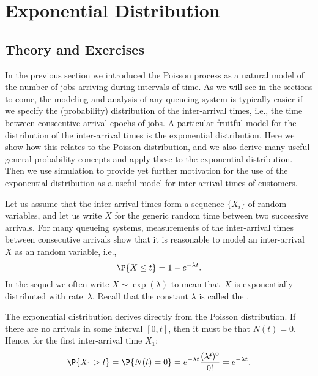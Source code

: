 \section{Exponential Distribution}
\label{sec:expon-distr}


\subsection*{Theory and Exercises}


In the previous section we introduced the Poisson process as a natural model of the number of jobs arriving during intervals of time.  As we will see in the sections to come, the modeling and analysis of any queueing system is typically easier if we specify  the (probability)
distribution of the inter-arrival times, i.e., the time between consecutive arrival epochs of jobs.
A particular fruitful model for the distribution of the inter-arrival times is the exponential distribution. Here we show how this relates to the Poisson distribution,  and we also derive many useful general probability concepts and apply these to the exponential distribution.  Then we use simulation to provide yet further motivation for the use of the exponential distribution as a useful model for inter-arrival times of customers.

Let us assume that the inter-arrival times form a sequence $\{X_i\}$ of   random variables, and let us write $X$ for the generic
random time between two successive arrivals. For many queueing
systems, measurements of the inter-arrival times between consecutive
arrivals show that it is reasonable to model an inter-arrival $X$ as
an  random variable, i.e.,
\begin{equation*}
  \P{X \leq t} = 1- e^{-\lambda t}.
\end{equation*}
In the sequel we often write $X\sim \exp(\lambda)$ to mean that~$X$ is
exponentially distributed with rate~$\lambda$.  Recall that the
constant $\lambda$ is called the .


The exponential distribution  derives directly from the Poisson distribution. If there are no arrivals in some interval $[0,t]$, then it
must be that $N(t) = 0$. Hence, for the first inter-arrival time $X_1$: %
\begin{equation*}
 \P{X_1> t} = \P{N(t) = 0} = e^{-\lambda t} \frac{(\lambda t)^0}{0!}= e^{-\lambda t}.
\end{equation*}


